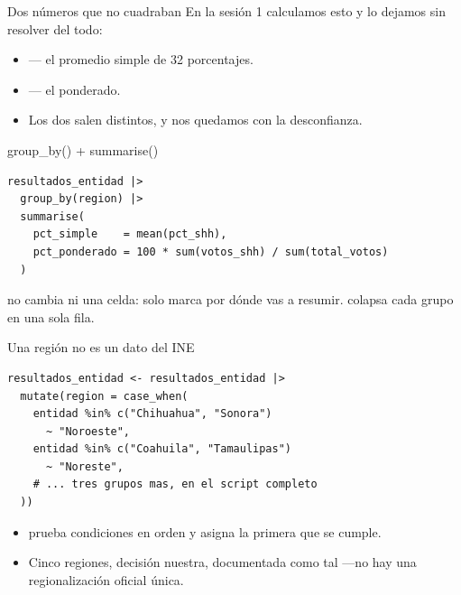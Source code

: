 \begin{frame}{Dos números que no cuadraban}
  \vspace{0.3em}
  En la sesión 1 calculamos esto y lo dejamos sin resolver del todo:

  \vspace{0.8em}
  \begin{itemize}\setlength{\itemsep}{0.9em}
    \item<1->  — el promedio simple de 32 porcentajes.
    \item<2->  — el ponderado.
    \item<3-> Los dos salen distintos, y nos quedamos con la desconfianza.
  \end{itemize}

  \vspace{1.0em}
\end{frame}

\begin{frame}[fragile]{group\_by() + summarise()}
\begin{lstlisting}
resultados_entidad |>
  group_by(region) |>
  summarise(
    pct_simple    = mean(pct_shh),
    pct_ponderado = 100 * sum(votos_shh) / sum(total_votos)
  )
\end{lstlisting}

  \vspace{0.6em}
   no cambia ni una celda: solo marca por dónde vas a resumir.
   colapsa cada grupo en una sola fila.
\end{frame}

\begin{frame}[fragile]{Una región no es un dato del INE}
\begin{lstlisting}
resultados_entidad <- resultados_entidad |>
  mutate(region = case_when(
    entidad %in% c("Chihuahua", "Sonora")
      ~ "Noroeste",
    entidad %in% c("Coahuila", "Tamaulipas")
      ~ "Noreste",
    # ... tres grupos mas, en el script completo
  ))
\end{lstlisting}

  \vspace{0.6em}
  \begin{itemize}\setlength{\itemsep}{0.6em}
    \item<1->  prueba condiciones en orden y asigna la
          primera que se cumple.
    \item<2-> Cinco regiones, decisión nuestra, documentada como tal —no hay
          una regionalización oficial única.
  \end{itemize}
\end{frame}

